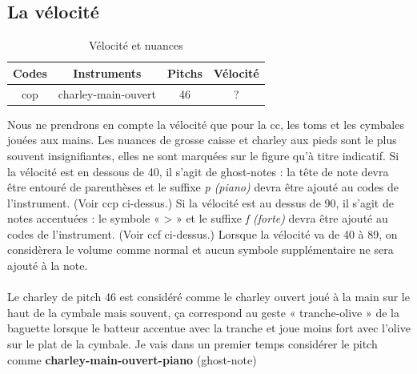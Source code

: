\subsection*{La vélocité}
\label{velocite}
\begin{table}[h]
	\centering
	\begin{tabular}{|c|c|c|c|} \hline
		Codes & Instruments & Pitchs & Vélocité \\ \hline
		cop & charley-main-ouvert & 46 & ? \\ \hline
	\end{tabular}
	\caption{Vélocité et nuances}
\end{table}
Nous ne prendrons en compte la vélocité que pour la cc, les toms et les cymbales jouées aux mains. Les nuances de grosse caisse et charley aux pieds sont le plus souvent insignifiantes, elles ne sont marquées sur le figure qu’à titre indicatif.
Si la vélocité est en dessous de 40, il s’agit de ghost-notes : la tête de note devra être entouré de parenthèses et le suffixe \textit{p (piano)} devra être ajouté au codes de l’instrument. (Voir ccp ci-dessus.)
Si la vélocité est au dessus de 90, il s’agit de notes accentuées : le symbole « > » et le suffixe \textit{f (forte)} devra être ajouté au codes de l’instrument. (Voir ccf ci-dessus.)
Lorsque la vélocité va de 40 à 89, on considèrera le volume comme normal et aucun symbole supplémentaire ne sera ajouté à la note.\\\\

Le charley de pitch 46 est considéré comme le charley ouvert joué à la main sur le haut de la cymbale mais souvent, ça correspond au geste « tranche-olive » de la baguette lorsque le batteur accentue avec la tranche et joue moins fort avec l’olive sur le plat de la cymbale. Je vais dans un premier temps considérer le pitch comme \textbf{charley-main-ouvert-piano} (ghost-note)
